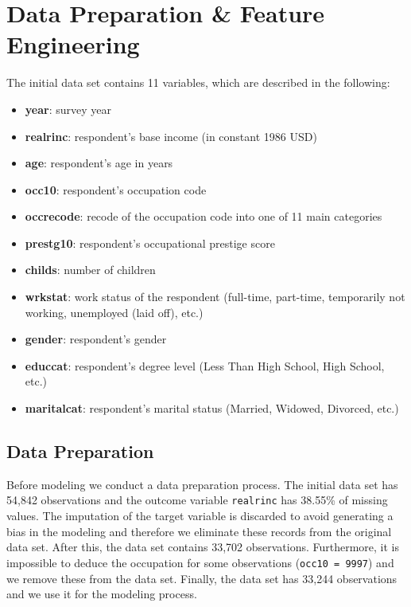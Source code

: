 \documentclass[11pt,a4paper]{article}
\begin{document}
\hypertarget{data-preparation-feature-engineering}{%
\section{Data Preparation \& Feature
Engineering}\label{data-preparation-feature-engineering}}

The initial data set contains 11 variables, which are described in the
following:

\begin{itemize}
\item
  \textbf{year}: survey year
\item
  \textbf{realrinc}: respondent's base income (in constant 1986 USD)
\item
  \textbf{age}: respondent's age in years
\item
  \textbf{occ10}: respondent's occupation code
\item
  \textbf{occrecode}: recode of the occupation code into one of 11 main
  categories
\item
  \textbf{prestg10}: respondent's occupational prestige score
\item
  \textbf{childs}: number of children
\item
  \textbf{wrkstat}: work status of the respondent (full-time, part-time,
  temporarily not working, unemployed (laid off), etc.)
\item
  \textbf{gender}: respondent's gender
\item
  \textbf{educcat}: respondent's degree level (Less Than High School,
  High School, etc.)
\item
  \textbf{maritalcat}: respondent's marital status (Married, Widowed,
  Divorced, etc.)
\end{itemize}

\hypertarget{data-preparation}{%
\subsection{Data Preparation}\label{data-preparation}}

Before modeling we conduct a data preparation process. The initial data
set has 54,842 observations and the outcome variable \texttt{realrinc}
has 38.55\% of missing values. The imputation of the target variable is
discarded to avoid generating a bias in the modeling and therefore we
eliminate these records from the original data set. After this, the data
set contains 33,702 observations. Furthermore, it is impossible to
deduce the occupation for some observations (\texttt{occ10\ =\ 9997})
and we remove these from the data set. Finally, the data set has 33,244
observations and we use it for the modeling process.
\end{document}
